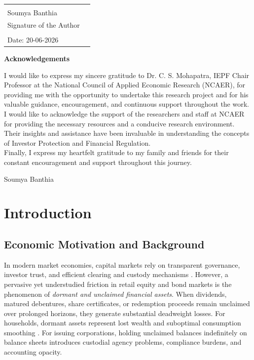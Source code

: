 \documentclass[openany]{book}
\begin{document}
{\begin{tabular}{p{6cm}l}
			& \\
            Soumya Banthia\\
			Signature of the Author \\
			& \\
			Date: 20-06-2026
		\end{tabular}}

	\newpage
	\centerline{\bf \Large Acknowledgements}
	\vspace*{0.5cm}
		\par\noindent 

I would like to express my sincere gratitude to Dr. C. S. Mohapatra, IEPF Chair Professor at the National Council of Applied Economic Research (NCAER), for providing me with the opportunity to undertake this research project and for his valuable guidance, encouragement, and continuous support throughout the work. \\
        
I would like to acknowledge the support of the researchers and staff at NCAER for providing the necessary resources and a conducive research environment. Their insights and assistance have been invaluable in understanding the concepts of Investor Protection and Financial Regulation.\\
        
Finally, I express my heartfelt gratitude to my family and friends for their constant encouragement and support throughout this journey.
		
		\vfill

        Soumya Banthia \\ 
		\par{}

\tableofcontents
\listoffigures
\listoftables

\chapter{Introduction}

\section{Economic Motivation and Background}
In modern market economies, capital markets rely on transparent governance, investor trust, and efficient clearing and custody mechanisms \cite{guiso2008trusting, zingales2009future}. However, a pervasive yet understudied friction in retail equity and bond markets is the phenomenon of \textit{dormant and unclaimed financial assets}. When dividends, matured debentures, share certificates, or redemption proceeds remain unclaimed over prolonged horizons, they generate substantial deadweight losses. For households, dormant assets represent lost wealth and suboptimal consumption smoothing \cite{campbell2006household}. For issuing corporations, holding unclaimed balances indefinitely on balance sheets introduces custodial agency problems, compliance burdens, and accounting opacity.
\end{document}
